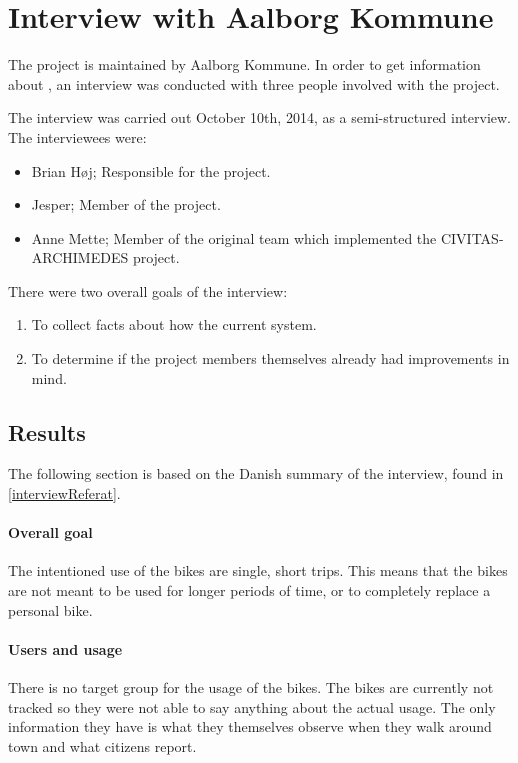 \section{Interview with Aalborg Kommune}
The \citybike project is maintained by Aalborg Kommune.
In order to get information about \citybike, an interview was conducted with three people involved with the project.

The interview was carried out October 10th, 2014, as a semi-structured interview.
The interviewees were:
\begin{itemize}
\item Brian Høj; Responsible for the \citybike project.
\item Jesper; Member of the \citybike project.
\item Anne Mette; Member of the original team which implemented the CIVITAS-ARCHIMEDES project\cite{aalborgbycyklenbagcyklen}.
\end{itemize}

\noindent There were two overall goals of the interview:
\begin{enumerate}
\item To collect facts about how the current system.
\item To determine if the project members themselves already had improvements in mind.
\end{enumerate}

\subsection{Results} \label{interview:goals}
The following section is based on the Danish summary of the interview, found in \cref{interviewReferat}.

\paragraph{Overall goal}
The intentioned use of the bikes are single, short trips.
This means that the bikes are not meant to be used for longer periods of time, or to completely replace a personal bike.

\paragraph{Users and usage}
There is no target group for the usage of the bikes.
The bikes are currently not tracked so they were not able to say anything about the actual usage.
The only information they have is what they themselves observe when they walk around town and what citizens report.

